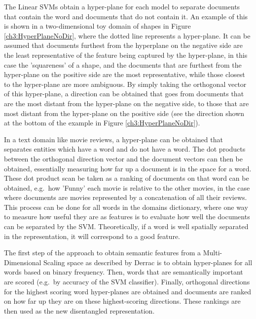The Linear SVMs obtain a hyper-plane for each model to  separate documents that contain the word and documents that do not contain it. An  example of this is shown in a two-dimensional toy domain of shapes in Figure \ref{ch3:HyperPlaneNoDir}, where the dotted line represents a hyper-plane. It can be assumed that documents furthest from the hyperplane on the negative side are the least representative of the feature being captured by the hyper-plane, in this case the 'squareness' of a shape, and the documents that are furthest from the hyper-plane on the positive side are the most representative, while those closest to the hyper-plane are more ambiguous. By simply taking the orthogonal vector of this hyper-plane, a direction can be obtained  that goes from documents that are the most distant from the hyper-plane on the negative side, to those that are most distant from the hyper-plane on the positive side (see the direction shown at the bottom of the example in Figure \ref{ch3:HyperPlaneNoDir}).

In a text domain like movie reviews, a hyper-plane can be obtained that  separates entities which have a word and do not have a word. The dot products between the orthogonal direction vector and the document vectors can then be obtained, essentially measuring how far up a document is in the space for a word. These dot product scan be taken as a ranking of  documents on that word can be obtained, e.g.\ how 'Funny' each movie is relative to the other movies, in the case where documents are movies represented by a concatenation of all their reviews. This process can be done for all words in the domains dictionary, where one way to measure how useful they are as features is to evaluate how well the documents can be separated by the SVM. Theoretically, if a   word is well spatially separated in the representation, it will correspond to a good feature. 

The first step of the approach to obtain semantic features from a Multi-Dimensional Scaling space as described by Derrac is to obtain hyper-planes for all words based on binary frequency. Then,  words that are semantically important are scored (e.g.\ by accuracy of the SVM classifier). Finally, orthogonal directions for the highest scoring word hyper-planes are obtained and  documents are ranked on how far up they are on these highest-scoring directions. These rankings  are then used as the new disentangled representation.

